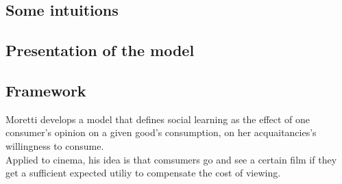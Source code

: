 \subsection{Some intuitions}

\subsection{Presentation of the model}



\subsection{Framework}
	Moretti develops a model that defines social learning as the effect of one consumer's opinion on a given good's consumption, on her acquaitancies's willingness to consume.\\
	Applied to cinema, his idea is that comsumers go and see a certain film if they get a sufficient expected utiliy to compensate the cost of viewing.\\
